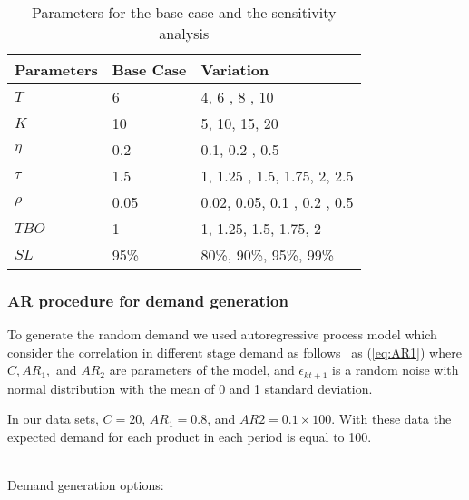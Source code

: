 \documentclass[10pt]{article}
\newcommand{\ti}{t} %
\newcommand{\TI}{\mathcal{T}}
\newcommand{\Ti}{T}
\newcommand{\ka}{k} %
\newcommand{\KA}{\mathcal{K}}
\newcommand{\Ka}{K}
\newcommand{\cred}{\color{red!65!black}}
\begin{document}
\begin{table}[H]
\centering
\caption{ Parameters for the base case and the sensitivity analysis} \label{tab:BaseSensitivity}
\begin{tabular}{lll}
\toprule
{\bf Parameters} & Base Case & Variation \\ \midrule
$\Ti$   & 6 & 4, 6 , 8 , 10\\ 
$\Ka$   & 10 & 5, 10, 15, 20\\ 
$\eta$  &   0.2 & 0.1, 0.2 , 0.5   \\ 
$\tau$  &   1.5 & 1, 1.25 , 1.5, 1.75, 2, 2.5   \\ 
$\rho $  &   0.05 & 0.02, 0.05, 0.1 , 0.2 , 0.5   \\ 
$ TBO $  &   1 & 1, 1.25, 1.5, 1.75, 2   \\ 
$ SL $  &95\% & 80\%, 90\%, 95\%, 99\%  \\ 
\bottomrule 
\end{tabular}
\end{table}

\subsubsection{AR procedure for demand generation}

To generate the random demand we used autoregressive process model which consider the correlation in different stage demand as follows~\cite{jiang2017production} as (\ref{eq:AR1}) where $C, AR_1,$ and $AR_2$ are parameters of the model, and $\epsilon_{\ka \ti+1}$ is a random noise with normal distribution with the mean of 0 and 1 standard deviation. 

 
{\cred{
\begin{flalign}
  &  d_{\ka \ti+1} = C + AR_1 \times d_{\ti \ka} + AR_2 \times \epsilon_{\ka \ti+1}   &\forall \ka  \in \KA , \forall \ti \in \TI  &     \label{eq:AR1}&
  \end{flalign}}}
  
  In our data sets, $C = 20$, $AR_1 = 0.8$, and $AR2 = 0.1 \times 100$. With these data the expected demand for each product in each period is equal to 100.  
  
  


{\cred{As we have no production in the first period without lose of generality we assume that the demand in the first period is equal to zero, other wise the if there is no initial inventory, the service level constraint wont be satisfied. In the AR data generation procedure we start with the defined average in the first period and then follow the procedure for the rest of the periods. Then to make the first period demand equal to 0 we subtract this average from the first period demand.}}\\
Demand generation options:
\end{document}

